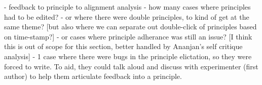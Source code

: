 - feedback to principle to alignment analysis
- how many cases where principles had to be edited? 
- or where there were double principles, to kind of get at the same theme? [but also where we can separate out double-click of principles based on time-stamp?]
- or cases where principle adherance was still an issue? [I think this is out of scope for this section, better handled by Ananjan's self critique analysis]
- 1 case where there were bugs in the principle elictation, so they were forced to write.  To aid, they could talk aloud and discuss with experimenter (first author) to help them articulate feedback into a principle.
\fi